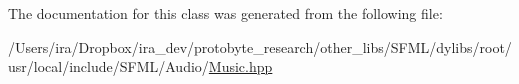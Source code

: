 The documentation for this class was generated from the following file\-:\begin{DoxyCompactItemize}
\item 
/\-Users/ira/\-Dropbox/ira\-\_\-dev/protobyte\-\_\-research/other\-\_\-libs/\-S\-F\-M\-L/dylibs/root/usr/local/include/\-S\-F\-M\-L/\-Audio/\hyperlink{_music_8hpp}{Music.\-hpp}\end{DoxyCompactItemize}
